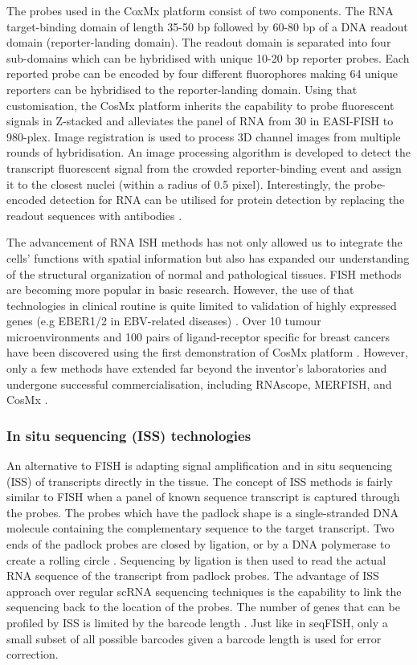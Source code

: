 The probes used in the CoxMx platform consist of two components. The RNA target-binding domain of length 35-50 bp followed by 60-80 bp of a DNA readout domain (reporter-landing domain). The readout domain is separated into four sub-domains which can be hybridised with unique 10-20 bp reporter probes. Each reported probe can be encoded by four different fluorophores making 64 unique reporters can be hybridised to the reporter-landing domain. Using that customisation, the CosMx platform inherits the capability to probe fluorescent signals in Z-stacked and alleviates the panel of RNA from 30 in EASI-FISH to 980-plex. Image registration is used to process 3D channel images from multiple rounds of hybridisation. An image processing algorithm is developed to detect the transcript fluorescent signal from the crowded reporter-binding event and assign it to the closest nuclei (within a radius of 0.5 pixel). Interestingly, the probe-encoded detection for RNA can be utilised for protein detection by replacing the readout sequences with antibodies \cite{he2022high}.   

The advancement of RNA ISH methods has not only allowed us to integrate the cells' functions with spatial information but also has expanded our understanding of the structural organization of normal and pathological tissues. FISH methods are becoming more popular in basic research. However, the use of that technologies in clinical routine is quite limited to validation of highly expressed genes (e.g EBER1/2 in EBV-related diseases) \cite{gulley2001molecular}. Over 10 tumour microenvironments  and 100 pairs of ligand-receptor specific for breast cancers have been discovered using the first demonstration of CosMx platform \cite{he2022high}. However, only a few methods have extended far beyond the inventor's laboratories and undergone successful commercialisation, including RNAscope, MERFISH, and CosMx \cite{conrad2022single}. 

\subsubsection{In situ sequencing (ISS) technologies}
An alternative to FISH is adapting signal amplification and in situ sequencing (ISS) of transcripts directly in the tissue. The concept of ISS methods is fairly similar to FISH when a panel of known sequence transcript is captured through the probes. The probes which have the padlock shape is a single-stranded DNA molecule containing the complementary sequence to the target transcript. Two ends of the padlock probes are closed by ligation, or by a DNA polymerase to create a rolling circle \cite{conrad2022single}. Sequencing by ligation is then used to read the actual RNA sequence of the transcript from padlock probes. The advantage of ISS approach over regular scRNA sequencing techniques is the capability to link the sequencing back to the location of the probes. The number of genes that can be profiled by ISS is limited by the barcode length \cite{williams2022introduction, asp2020spatially}. Just like in seqFISH, only a small subset of all possible barcodes given a barcode length is used for error correction.

